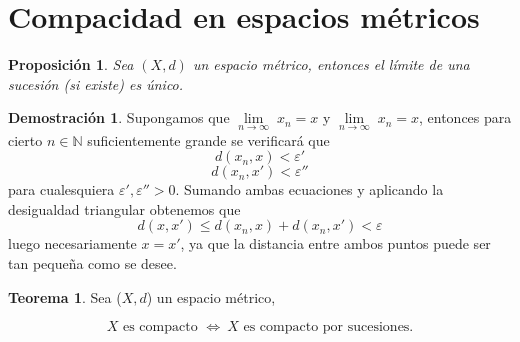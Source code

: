 \documentclass[12pt,twoside]{report}
\theoremstyle{azul}
\theoremstyle{azul2}
\theoremstyle{plain}
\newtheorem*{prop}{Proposición}
\theoremstyle{definition}
\newtheorem*{dem}{Demostración}
\newtheorem*{teo}{Teorema}
\theoremstyle{remark}
\providecommand{\Lim}[3]{\underset{#1\to#2}{\lim}\; #3}
\begin{document}
\section{Compacidad en espacios m{\'e}tricos}
\begin{prop}
    Sea $(X,d)$ un espacio métrico, entonces el límite de una sucesión (si existe) es único.
\end{prop}
\begin{dem}
Supongamos que $\Lim{n}{\infty}{x_n}=x$ y $\Lim{n}{\infty}{x_n}=x$, entonces para cierto $n\in \mathbb{N}$ suficientemente grande se verificará que
$$d(x_n,x)<\varepsilon'$$
$$d(x_n,x')<\varepsilon''$$
para cualesquiera $\varepsilon',\varepsilon''>0$. Sumando ambas ecuaciones y aplicando la desigualdad triangular obtenemos que
$$d(x,x')\leq d(x_n,x)+d(x_n,x')<\varepsilon $$
luego necesariamente $x=x'$, ya que la distancia entre ambos puntos puede ser tan pequeña como se desee.



\end{dem}
\begin{teo}
Sea ($X,d$) un espacio m{\'e}trico,
\begin{tcolorbox}
\vspace{-4mm}
$$X \text{ es compacto } \Leftrightarrow \: X \text{ es compacto por sucesiones.}$$
\end{tcolorbox}
\end{teo}
\end{document}
